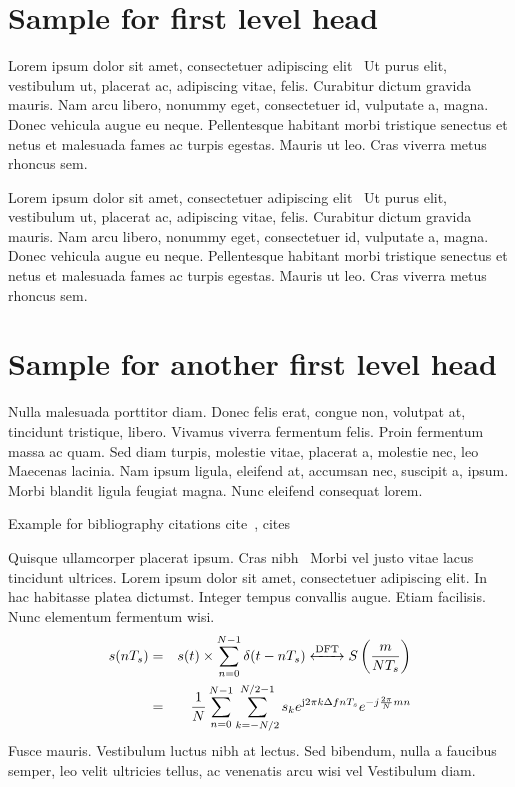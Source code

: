 \documentclass[proof]{WileyASNA-v1}
\begin{document}
\section{Sample for first level head}\label{sec1}

Lorem ipsum dolor sit amet, consectetuer adipiscing elit~\citet{Kosugi2007} Ut purus elit, vestibulum ut, placerat ac, adipiscing vitae,
felis. Curabitur dictum gravida mauris. Nam arcu libero, nonummy eget, consectetuer id, vulputate a, magna. Donec
vehicula augue eu neque. Pellentesque habitant morbi tristique senectus et netus et malesuada fames ac turpis egestas.
Mauris ut leo. Cras viverra metus rhoncus sem. 

Lorem ipsum dolor sit amet, consectetuer adipiscing elit~\citet{Kosugi2007} Ut purus elit, vestibulum ut, placerat ac, adipiscing vitae,
felis. Curabitur dictum gravida mauris. Nam arcu libero, nonummy eget, consectetuer id, vulputate a, magna. Donec
vehicula augue eu neque. Pellentesque habitant morbi tristique senectus et netus et malesuada fames ac turpis egestas.
Mauris ut leo. Cras viverra metus rhoncus sem. 

\section{Sample for another first level head}\label{sec2}

Nulla malesuada porttitor diam. Donec felis erat, congue non, volutpat at, tincidunt tristique, libero. Vivamus viverra
fermentum felis. Proin fermentum massa ac
quam. Sed diam turpis, molestie vitae, placerat a, molestie nec, leo~\cite{Bland2001} Maecenas lacinia. Nam ipsum ligula, eleifend
at, accumsan nec, suscipit a, ipsum. Morbi blandit ligula feugiat magna. Nunc eleifend consequat lorem. 

Example for bibliography citations cite~\citep{Kosugi2009}, cites~\cite{Stix2004}

Quisque ullamcorper placerat ipsum. Cras nibh~\cite{Kosugi2009,Stix2004} Morbi vel justo vitae lacus tincidunt ultrices. Lorem ipsum dolor sit
amet, consectetuer adipiscing elit. In hac habitasse platea dictumst. Integer tempus convallis augue. Etiam facilisis.
Nunc elementum fermentum wisi. 
\begin{eqnarray}
s(nT_{s}) &= &s(t)\times \sum\limits_{n=0}^{N-1} \delta (t-nT_{s}) \xleftrightarrow{\mathrm{DFT}}  S \left(\frac{m}{NT_{s}}\right) \nonumber\\
&= &\frac{1}{N} \sum\limits_{n=0}^{N-1} \sum\limits_{k=-N/2}^{N/2-1} s_{k} e^{\mathrm{j}2\pi k\Delta fnT_{s}} e^{-j\frac{2\pi}{N}mn}
\end{eqnarray}
Fusce mauris. Vestibulum luctus nibh at lectus. Sed bibendum, nulla a faucibus semper, leo velit ultricies tellus, ac
venenatis arcu wisi vel Vestibulum diam. 
\end{document}
